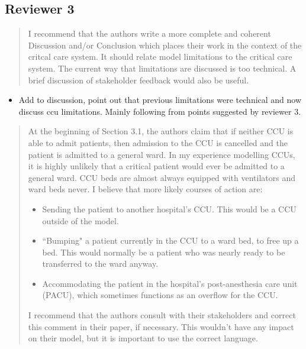 \documentclass{article}
\begin{document}
\subsection{Reviewer 3}


\begin{quote}
    \begin{textit}
        {I recommend that the authors write a more complete and coherent
        Discussion and/or Conclusion which places their work in the context of
        the critcal care system.  It should relate model limitations to the
        critical care system. The current way that limitations are discussed
        is too technical. A brief discussion of stakeholder feedback would
        also be useful.}
    \end{textit}
\end{quote}

\begin{itemize}
    \item Add to discussion, point out that previous limitations were technical and now discuss ccu limitations. Mainly following from points suggested by reviewer 3.
\end{itemize}

\begin{quote}
    \begin{textit}
        {
        At the beginning of Section 3.1, the authors claim that if neither CCU
        is able to admit patients, then admission to the CCU is cancelled and
        the patient is admitted to a general ward. In my experience modelling
        CCUs, it is highly unlikely that a critical patient would ever be
        admitted to a general ward.  CCU beds are almost always equipped with
        ventilators and ward beds never. I believe that more likely courses of
        action are:
        \begin{itemize}
         \item Sending the patient to another hospital's CCU.  This would be a CCU
           outside of the model.
         \item ``Bumping" a patient currently in the CCU to a ward bed, to free up
           a bed. This would normally be a patient who was nearly ready to be
           transferred to the ward anyway.
         \item Accommodating the patient in the hospital's post-anesthesia care
           unit (PACU), which sometimes functions as an overflow for the CCU.
        \end{itemize}
        I recommend that the authors consult with their stakeholders and
        correct this comment in their paper, if necessary.  This wouldn't have
        any impact on their model, but it is important to use the correct
        language.
        }
    \end{textit}
\end{quote}
\end{document}
